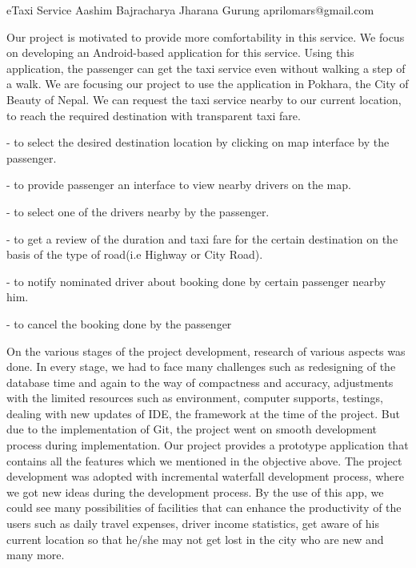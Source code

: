  \begin{conf-abstract}[]
 {eTaxi Service}
 {Aashim Bajracharya
 	 Jharana Gurung
 }
{aprilomars@gmail.com}

Our project is motivated to provide more comfortability in this service. We focus on developing an Android-based application for this service. Using this application, the passenger can get the taxi service even without walking a step of a walk. We are focusing our project to use the application in Pokhara, the City of Beauty of Nepal. We can request the taxi service nearby to our current location, to reach the required destination with transparent taxi fare.

- to select the desired destination location by clicking on map interface by the passenger.

- to provide passenger an interface to view nearby drivers on the map.

- to select one of the drivers nearby by the passenger.

- to get a review of the duration and taxi fare for the certain destination on the basis of the type of road(i.e Highway or City Road).

- to notify nominated driver about booking done by certain passenger nearby him.

- to cancel the booking done by the passenger

On the various stages of the project development, research of various aspects was done. In every stage, we had to face many challenges such as redesigning of the database time and again to the way of compactness and accuracy, adjustments with the limited resources such as environment, computer supports, testings, dealing with new updates of IDE, the framework at the time of the project. But due to the implementation of Git, the project went on smooth development process during implementation. Our project provides a prototype application that contains all the features which we mentioned in the objective above. The project development was adopted with incremental waterfall development process, where we got new ideas during the development process. By the use of this app, we could see many possibilities of facilities that can enhance the productivity of the users such as daily travel expenses, driver income statistics, get aware of his current location so that he/she may not get lost in the city who are new and many more. 

 \end{conf-abstract}
